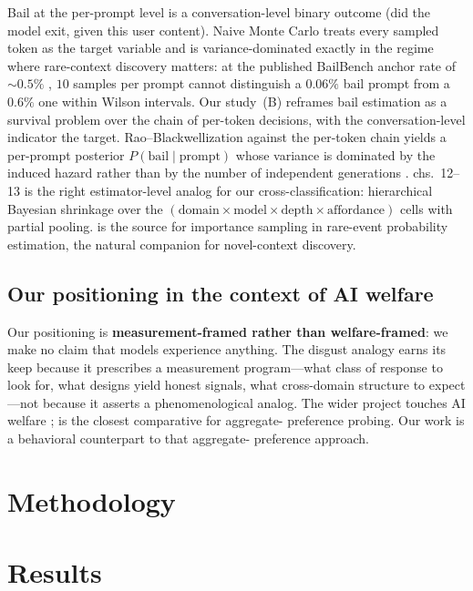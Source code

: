 \documentclass{article}
\begin{document}
Bail at the per-prompt level is a conversation-level binary outcome (did the
model exit, given this user content). Naive Monte Carlo treats every sampled
token as the target variable and is variance-dominated exactly in the regime
where rare-context discovery matters: at the published BailBench anchor rate
of $\sim\!0.5\%$ \citep{ensign2025bail}, $10$ samples per prompt cannot
distinguish a $0.06\%$ bail prompt from a $0.6\%$ one within Wilson intervals.
Our study~(B) reframes bail estimation as a survival problem over the chain of
per-token decisions, with the conversation-level indicator the target.
Rao--Blackwellization against the per-token chain yields a per-prompt posterior
$P(\text{bail}\mid\text{prompt})$ whose variance is dominated by the induced
hazard rather than by the number of independent generations
\citep{gelman2013bda3,casella2002statistical}. \citet{mcelreath2020rethinking}
chs.~12--13 is the right estimator-level analog for our cross-classification:
hierarchical Bayesian shrinkage over the
$(\text{domain}\times\text{model}\times\text{depth}\times\text{affordance})$
cells with partial pooling. \citet{owen2013monte} is the source for importance
sampling in rare-event probability estimation, the natural companion for
novel-context discovery.

\subsection{Our positioning in the context of AI welfare}

Our positioning is \textbf{measurement-framed rather than welfare-framed}: we
make no claim that models experience anything. The disgust analogy earns its
keep because it prescribes a measurement program---what class of response to
look for, what designs yield honest signals, what cross-domain structure to
expect---not because it asserts a phenomenological analog. The wider project
touches AI welfare \citep{long2024welfare,long2025interventions,butlin2023consciousness,mazeika2025utility};
\citet{sachdeva2025normative} is the closest comparative for aggregate-
preference probing. Our work is a behavioral counterpart to that aggregate-
preference approach.

\section{Methodology}


\section{Results}
\end{document}
